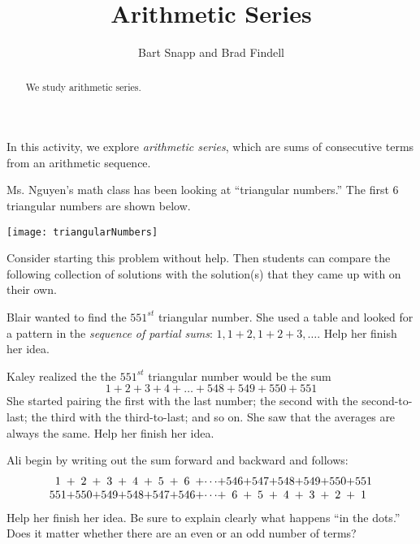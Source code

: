 \documentclass{ximera}
\title{Arithmetic Series}
\author{Bart Snapp and Brad Findell}
\begin{document}
\begin{abstract}
We study arithmetic series.
\end{abstract}
\maketitle

\label{A:arithmeticSeries}

In this activity, we explore \emph{arithmetic series}, which are sums of consecutive terms from an arithmetic sequence.

Ms. Nguyen's math class has been looking at ``triangular numbers.''  The first 6 triangular numbers are shown below. 
\begin{image}
\texttt{[image: triangularNumbers]} %
\end{image}

\begin{teachingnote}
Consider starting this problem without help.  Then students can 
compare the following collection of solutions with the solution(s) that they came up with on their own. 
\end{teachingnote}

\begin{problem}
Blair wanted to find the $551^{st}$ triangular number.  She used a table and looked for a pattern in the \emph{sequence of partial sums}:  $1, 1+2, 1+2+3, \dots$.  Help her finish her idea.  
\end{problem}

\begin{problem}
Kaley realized the the $551^{st}$ triangular number would be the sum 
\[
1+2+3+4+\dots+548+549+550+551
\]
She started pairing the first with the last number; the second with the second-to-last; the third with the third-to-last; and so on.  She saw that the averages are always the same.  Help her finish her idea.  
\end{problem}

\begin{problem}
Ali begin by writing out the sum forward and backward and follows:  
\[
\begin{array}{c@{ + }c@{ + }c@{ + }c@{ + }c@{ + }c@{ + }c@{ + }c@{ + }c@{ + }c@{ + }c@{ + }c@{ + }c}
1 & 2 & 3 & 4 & 5 & 6 & \cdots & 546 & 547 & 548 & 549 & 550 & 551 \\
551 & 550 & 549 & 548 & 547 & 546 & \cdots & 6 & 5 & 4 & 3 & 2 & 1 
\end{array}
\]
Help her finish her idea.  Be sure to explain clearly what happens ``in the dots.''  Does it matter whether there are an even or an odd number of terms?  
\end{problem}
\end{document}
